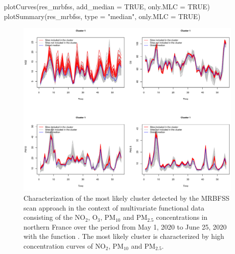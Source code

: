 \begin{example}
 plotCurves(res_mrbfss, add_median = TRUE, only.MLC = TRUE)
 plotSummary(res_mrbfss, type = "median", only.MLC = TRUE)
\end{example}

\begin{figure}[htbp]
\centering
\includegraphics[width=\linewidth]{curves_mrbfss.pdf}
\caption{
Characterization of the most likely cluster detected by the MRBFSS scan approach in the context of multivariate functional data consisting of the $\text{NO}_2$, $\text{O}_3$, $\text{PM}_{10}$ and $\text{PM}_{2.5}$ concentrations in northern France over the period from May 1, 2020 to June 25, 2020 with the function .
The most likely cluster is characterized by high concentration curves of $\text{NO}_2$, $\text{PM}_{10}$ and $\text{PM}_{2.5}$.
}
\label{fig:curves_multi}
\end{figure}

